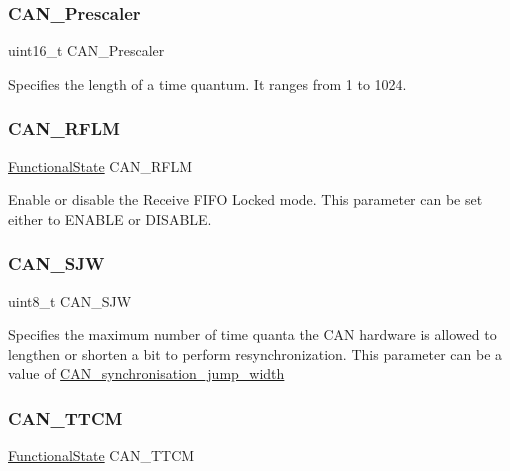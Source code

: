 \subsubsection{\texorpdfstring{CAN\_Prescaler}{CAN\_Prescaler}}
{\footnotesize\ttfamily uint16\+\_\+t C\+A\+N\+\_\+\+Prescaler}

Specifies the length of a time quantum. It ranges from 1 to 1024. \mbox{\label{struct_c_a_n___init_type_def_a8e091965db871827fca02c636f42e3ac}} 
\subsubsection{\texorpdfstring{CAN\_RFLM}{CAN\_RFLM}}
{\footnotesize\ttfamily \mbox{\hyperlink{group___exported__types_gac9a7e9a35d2513ec15c3b537aaa4fba1}{Functional\+State}} C\+A\+N\+\_\+\+R\+F\+LM}

Enable or disable the Receive F\+I\+FO Locked mode. This parameter can be set either to E\+N\+A\+B\+LE or D\+I\+S\+A\+B\+LE. \mbox{\label{struct_c_a_n___init_type_def_ad3a242b080dd6b9bda227520bf15a580}} 
\subsubsection{\texorpdfstring{CAN\_SJW}{CAN\_SJW}}
{\footnotesize\ttfamily uint8\+\_\+t C\+A\+N\+\_\+\+S\+JW}

Specifies the maximum number of time quanta the C\+AN hardware is allowed to lengthen or shorten a bit to perform resynchronization. This parameter can be a value of \mbox{\hyperlink{group___c_a_n__synchronisation__jump__width}{C\+A\+N\+\_\+synchronisation\+\_\+jump\+\_\+width}} \mbox{\label{struct_c_a_n___init_type_def_ad3f995849aaf6dfbd79e0e70a37f28a9}} 
\subsubsection{\texorpdfstring{CAN\_TTCM}{CAN\_TTCM}}
{\footnotesize\ttfamily \mbox{\hyperlink{group___exported__types_gac9a7e9a35d2513ec15c3b537aaa4fba1}{Functional\+State}} C\+A\+N\+\_\+\+T\+T\+CM}

